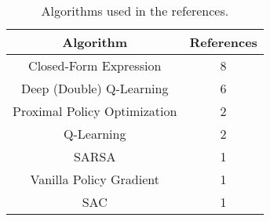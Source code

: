 \begin{table}
    \centering
    \begin{tabular}{|c|c|}
        \hline
        \textbf{Algorithm}           & \textbf{References} \\
        \hline
        Closed-Form Expression       & 8                   \\
        Deep (Double) Q-Learning     & 6                   \\
        Proximal Policy Optimization & 2                   \\
        Q-Learning                   & 2                   \\
        SARSA                        & 1                   \\
        Vanilla Policy Gradient      & 1                   \\
        SAC                          & 1                   \\
        \hline
    \end{tabular}
    \caption{Algorithms used in the references.}
    \label{tab:table1}
\end{table}
